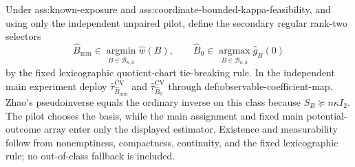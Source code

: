 Under ass:known-exposure and ass:coordinate-bounded-kappa-feasibility, and using only the independent unpaired pilot, define the secondary regular rank-two selectors
\[
\widehat B_{\mathrm{mm}}
\in\operatorname*{argmin}_{B\in\mathcal B_{\kappa,\overline a}}\widehat w(B),
\qquad
\widehat B_0
\in\operatorname*{argmax}_{B\in\mathcal B_{\kappa,\overline a}}\widehat g_B(0)
\]
by the fixed lexicographic quotient-chart tie-breaking rule.  In the independent main experiment deploy \(\widehat\tau_{\widehat B_{\mathrm{mm}}}^{\mathrm{CV}}\) and \(\widehat\tau_{\widehat B_0}^{\mathrm{CV}}\) through def:observable-coefficient-map.  Zhao's pseudoinverse equals the ordinary inverse on this class because \(S_B\succeq n\kappa I_2\).  The pilot chooses the basis, while the main assignment and fixed main potential-outcome array enter only the displayed estimator.  Existence and measurability follow from nonemptiness, compactness, continuity, and the fixed lexicographic rule; no out-of-class fallback is included.